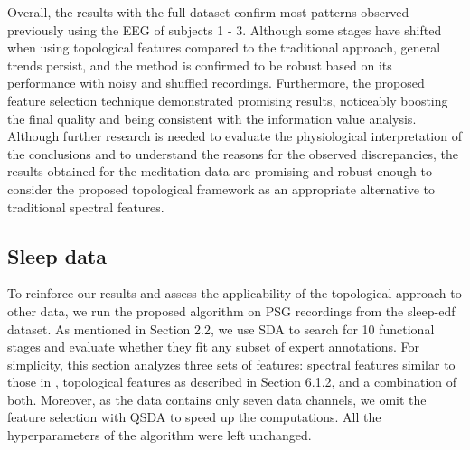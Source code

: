 \documentclass[10pt]{iopart}
\begin{document}
Overall, the results with the full dataset confirm most patterns observed previously using the EEG of subjects 1 - 3. Although some stages have shifted when using topological features compared to the traditional approach, general trends persist, and the method is confirmed to be robust based on its performance with noisy and shuffled recordings. Furthermore, the proposed feature selection technique demonstrated promising results, noticeably boosting the final quality and being consistent with the information value analysis. Although further research is needed to evaluate the physiological interpretation of the conclusions and to understand the reasons for the observed discrepancies, the results obtained for the meditation data are promising and robust enough to consider the proposed topological framework as an appropriate alternative to traditional spectral features.

\subsection{Sleep data}

To reinforce our results and assess the applicability of the topological approach to other data, we run the proposed algorithm on PSG recordings from the sleep-edf dataset. As mentioned in Section 2.2, we use SDA to search for 10 functional stages and evaluate whether they fit any subset of expert annotations. For simplicity, this section analyzes three sets of features: spectral features similar to those in \cite{SDA}, topological features as described in Section 6.1.2, and a combination of both. Moreover, as the data contains only seven data channels, we omit the feature selection with QSDA to speed up the computations. All the hyperparameters of the algorithm were left unchanged.
\end{document}
